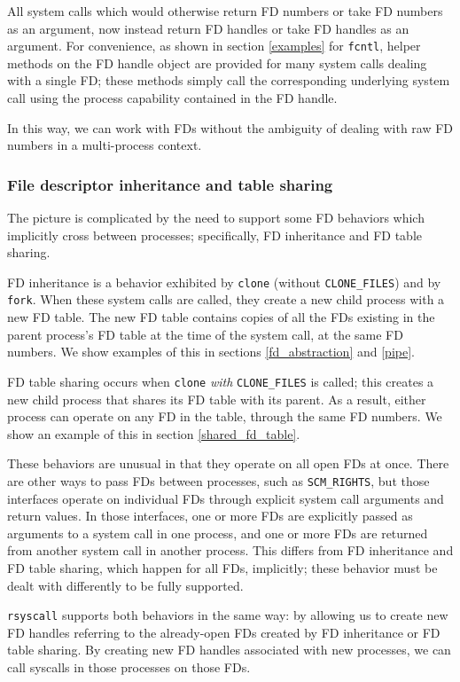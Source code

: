 \documentclass[letterpaper,twocolumn,10pt]{article}
\begin{document}
All system calls which would otherwise return FD numbers or take FD numbers as an argument,
now instead return FD handles or take FD handles as an argument.
For convenience, as shown in section \ref{examples} for \texttt{fcntl},
helper methods on the FD handle object are provided for many system calls dealing with a single FD;
these methods simply call the corresponding underlying system call
using the process capability contained in the FD handle.

In this way, we can work with FDs without the ambiguity of dealing with raw FD numbers in a multi-process context.
\subsubsection{File descriptor inheritance and table sharing}\label{inheritance}
The picture is complicated by the need to support some FD behaviors which implicitly cross between processes;
specifically, FD inheritance and FD table sharing.

FD inheritance is a behavior exhibited by \texttt{clone} (without \verb|CLONE_FILES|) and by \texttt{fork}.
When these system calls are called,
they create a new child process with a new FD table.
The new FD table contains copies of all the FDs existing in the parent process's FD table at the time of the system call,
at the same FD numbers.
We show examples of this in sections \ref{fd_abstraction} and \ref{pipe}.

FD table sharing occurs when \texttt{clone} \textit{with} \texttt{CLONE\_FILES} is called;
this creates a new child process that shares its FD table with its parent.
As a result, either process can operate on any FD in the table,
through the same FD numbers.
We show an example of this in section \ref{shared_fd_table}.

These behaviors are unusual in that they operate on all open FDs at once.
There are other ways to pass FDs between processes,
such as \texttt{SCM\_RIGHTS}\cite{scm_rights},
but those interfaces operate on individual FDs through explicit system call arguments and return values.
In those interfaces,
one or more FDs are explicitly passed as arguments to a system call in one process,
and one or more FDs are returned from another system call in another process.
This differs from FD inheritance and FD table sharing, which happen for all FDs, implicitly;
these behavior must be dealt with differently to be fully supported.

\texttt{rsyscall} supports both behaviors in the same way:
by allowing us to create new FD handles
referring to the already-open FDs created by FD inheritance or FD table sharing.
By creating new FD handles associated with new processes, we can call syscalls in those processes on those FDs.
\end{document}
